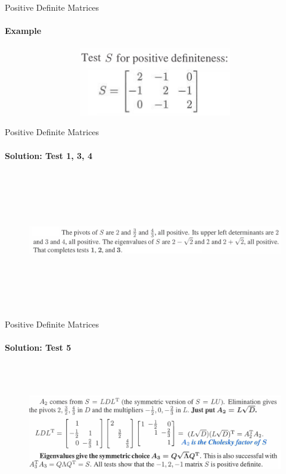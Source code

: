 \documentclass[aspectratio=169]{beamer}
\newcommand{\fbckg}[1]{\usebackgroundtemplate{\texttt{[image: \#1]}}}%
\begin{document}
\usebackgroundtemplate{}

\fbckg{fibeamer/figs/common.png}

\begin{frame}[t]{Positive Definite Matrices}
\framesubtitle{Example}
\begin{figure}[H]
    \centering\includegraphics[height=3cm,width=1\textwidth,keepaspectratio]{pos_def_ex1.png}
    \label{fig:pos_def_ex1.png}
\end{figure}
\end{frame}

\begin{frame}[t]{Positive Definite Matrices}
    \framesubtitle{Solution: Test 1, 3, 4}
    \begin{figure}[H]
        \centering\includegraphics[height=6cm,width=1\textwidth,keepaspectratio]{pos_def_ex1_ans1.png}
        \label{fig:pos_def_ex1_ans1.png}
    \end{figure}
    \end{frame}

    \begin{frame}[t]{Positive Definite Matrices}
        \framesubtitle{Solution: Test 5}
        \begin{figure}[H]
            \centering\includegraphics[height=6cm,width=1\textwidth,keepaspectratio]{pos_def_ex1_ans2.png}
            \label{fig:pos_def_ex1_ans2.png}
        \end{figure}
        \end{frame}
\end{document}
